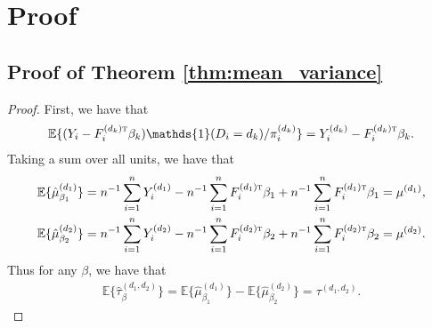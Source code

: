 \documentclass[twoside,letterpaper]{article}
\newcommand{\mathbbm}[1]{\mathds{#1}}
\theoremstyle{plain}
\theoremstyle{definition}
\theoremstyle{remark}
\newcommand{\E}{\mathbb{E}}
\def\T{{\textsc{t}}}
\newcommand{\indicator}{\mathbbm{1}}
\newcommand{\sumi}{\sum_{i=1}^n}
\begin{document}
\section{Proof}\label{sec:proof}
\subsection{Proof of Theorem \ref{thm:mean_variance}}
\begin{proof}
    First, we have that
    \begin{eqnarray*}
        \E\{(Y_i - F_i^{(d_k)\T} \beta_k)\indicator(D_i=d_k)/\pi_i^{(d_k)}\} = Y_i^{(d_k)} - F_i^{(d_k)\T} \beta_k.
    \end{eqnarray*}
    Taking a sum over all units, we have that
    \begin{eqnarray*}
        \E\{\hat\mu{}^{(d_1)}_{\beta_1}\} = n^{-1} \sumi Y_i^{(d_1)} - n^{-1} \sumi F_i^{(d_1)\T} \beta_1 + n^{-1} \sumi F_i^{(d_1)\T} \beta_1 = \mu^{(d_1)}, \\
        \E\{\hat\mu{}^{(d_2)}_{\beta_2}\} = n^{-1} \sumi Y_i^{(d_2)} - n^{-1} \sumi F_i^{(d_2)\T} \beta_2 + n^{-1} \sumi F_i^{(d_2)\T} \beta_2 = \mu^{(d_2)}.
    \end{eqnarray*} 
    Thus for any $\beta$, we have that
    \begin{eqnarray*}
        \E\{\hat\tau^{(d_1, d_2)}_{\beta}\} = \E\{\hat\mu^{(d_1)}_{\beta_1}\} - \E\{\hat\mu^{(d_2)}_{\beta_2}\} = \tau^{(d_1, d_2)}.
    \end{eqnarray*}


\end{proof}
\end{document}
